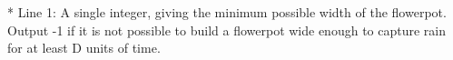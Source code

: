 * Line 1: A single integer, giving the minimum possible width of the         flowerpot.  Output -1 if it is not possible to build a         flowerpot wide enough to capture rain for at least D units of         time.